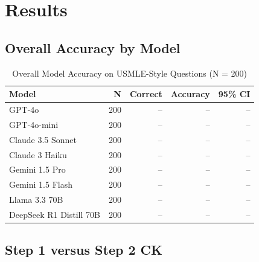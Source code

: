 \section{Results}

\subsection{Overall Accuracy by Model}


\begin{table}[htbp]
\centering
\caption{Overall Model Accuracy on USMLE-Style Questions (N = 200)}
\label{tab:overall_accuracy}
\begin{tabular}{lrrrr}
\toprule
Model & N & Correct & Accuracy & 95\% CI \\
\midrule
GPT-4o & 200 & -- & -- & -- \\
GPT-4o-mini & 200 & -- & -- & -- \\
Claude 3.5 Sonnet & 200 & -- & -- & -- \\
Claude 3 Haiku & 200 & -- & -- & -- \\
Gemini 1.5 Pro & 200 & -- & -- & -- \\
Gemini 1.5 Flash & 200 & -- & -- & -- \\
Llama 3.3 70B & 200 & -- & -- & -- \\
DeepSeek R1 Distill 70B & 200 & -- & -- & -- \\
\bottomrule
\end{tabular}
\end{table}

\subsection{Step 1 versus Step 2 CK}


